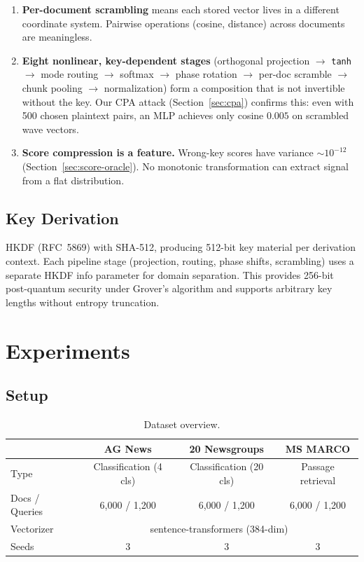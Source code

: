 \documentclass{article}
\begin{document}
\begin{enumerate}[nosep]
  \item \textbf{Per-document scrambling} means each stored vector lives in a different coordinate system. Pairwise operations (cosine, distance) across documents are meaningless.
  \item \textbf{Eight nonlinear, key-dependent stages} (orthogonal projection $\to$ \texttt{tanh} $\to$ mode routing $\to$ softmax $\to$ phase rotation $\to$ per-doc scramble $\to$ chunk pooling $\to$ normalization) form a composition that is not invertible without the key. Our CPA attack (Section~\ref{sec:cpa}) confirms this: even with 500 chosen plaintext pairs, an MLP achieves only cosine $0.005$ on scrambled wave vectors.
  \item \textbf{Score compression is a feature.} Wrong-key scores have variance ${\sim}10^{-12}$ (Section~\ref{sec:score-oracle}). No monotonic transformation can extract signal from a flat distribution.
\end{enumerate}

\subsection{Key Derivation}

HKDF (RFC~5869) with SHA-512, producing 512-bit key material per derivation context.
Each pipeline stage (projection, routing, phase shifts, scrambling) uses a separate HKDF info parameter for domain separation.
This provides 256-bit post-quantum security under Grover's algorithm and supports arbitrary key lengths without entropy truncation.


\section{Experiments}
\label{sec:experiments}

\subsection{Setup}

\begin{table}[htbp]
\centering
\caption{Dataset overview.}
\label{tab:datasets}
\begin{tabular}{@{}lccc@{}}
\toprule
 & \textbf{AG News} & \textbf{20 Newsgroups} & \textbf{MS MARCO} \\
\midrule
Type & Classification (4 cls) & Classification (20 cls) & Passage retrieval \\
Docs / Queries & 6{,}000 / 1{,}200 & 6{,}000 / 1{,}200 & 6{,}000 / 1{,}200 \\
Vectorizer & \multicolumn{3}{c}{sentence-transformers (384-dim)} \\
Seeds & 3 & 3 & 3 \\
\bottomrule
\end{tabular}
\end{table}
\end{document}
